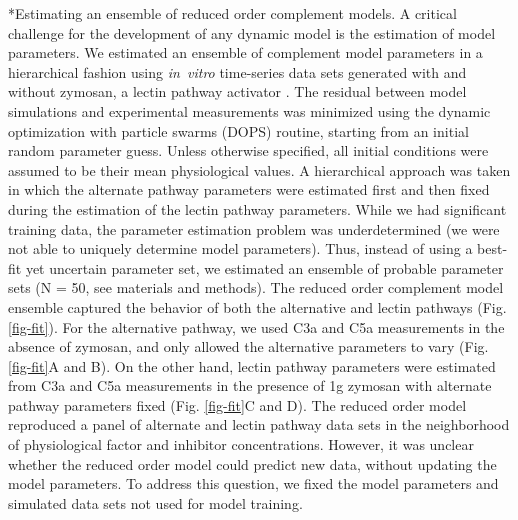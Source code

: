 \documentclass[12pt]{article}
\makeatletter
\renewcommand\subsection{\@startsection
	{subsection}{2}{0mm}
	{-0.05in}
	{-0.5\baselineskip}
	{\normalfont\normalsize\bfseries}}
\makeatother
\begin{document}
\subsection*{Estimating an ensemble of reduced order complement models.}
A critical challenge for the development of any dynamic model is the estimation of model parameters.
We estimated an ensemble of complement model parameters in a hierarchical fashion using \textit{in~vitro} time-series data sets generated with and without zymosan, a lectin pathway activator \cite{morad2015time}.
The residual between model simulations and experimental measurements was minimized using the dynamic optimization with particle swarms (DOPS) routine,
starting from an initial random parameter guess. Unless otherwise specified, all initial conditions were assumed to be their mean physiological values.
A hierarchical approach was taken in which the alternate pathway parameters were estimated first and then fixed during the estimation of the lectin pathway parameters.
While we had significant training data, the parameter estimation problem was underdetermined (we were not able to uniquely determine model parameters).
Thus, instead of using a best-fit yet uncertain parameter set, we estimated an ensemble of probable parameter sets (N = 50, see materials and methods).
The reduced order complement model ensemble captured the behavior of both the alternative and lectin pathways (Fig. \ref{fig-fit}).
For the alternative pathway, we used C3a and C5a measurements in the absence of zymosan, and only allowed the alternative parameters to vary (Fig. \ref{fig-fit}A and B).
On the other hand, lectin pathway parameters were estimated from C3a and C5a measurements in the presence of 1g zymosan with alternate pathway parameters fixed (Fig. \ref{fig-fit}C and D).
The reduced order model reproduced a panel of alternate and lectin pathway data sets in the neighborhood of physiological factor and inhibitor concentrations.
However, it was unclear whether the reduced order model could predict new data, without updating the model parameters.
To address this question, we fixed the model parameters and simulated data sets not used for model training.

\end{document}
